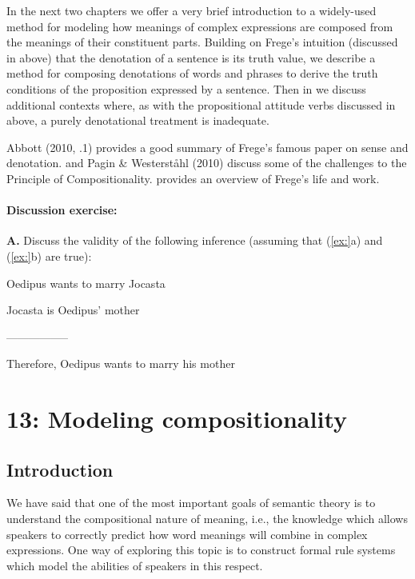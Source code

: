 In the next two chapters we offer a very brief introduction to a widely-used method for modeling how meanings of complex expressions are composed from the meanings of their constituent parts. Building on Frege’s intuition (discussed in  above) that the denotation of a sentence is its truth value, we describe a method for composing denotations of words and phrases to derive the truth conditions of the proposition expressed by a sentence. Then in  we discuss additional contexts where, as with the propositional attitude verbs discussed in  above, a purely denotational treatment is inadequate.



\furtherreading



Abbott (2010, .1) provides a good summary of Frege’s famous paper on sense and denotation. \citet{Goldberg2015} and Pagin \& Westerståhl (2010) discuss some of the challenges to the Principle of Compositionality. \citet{Zalta2017} provides an overview of Frege’s life and work.


\subsubsection{Discussion exercise:}\label{sec:}

\textbf{A.} Discuss the validity of the following inference (assuming that (\ref{ex:}a) and (\ref{ex:}b) are true):

\ea
\ea
Oedipus wants to marry Jocasta

\ex Jocasta is Oedipus’ mother

-----------------

\ex Therefore, Oedipus wants to marry his mother
\z
\z
\chapter{{13}: Modeling compositionality}

\section{Introduction}\label{sec:} %

We have said that one of the most important goals of semantic theory is to understand the compositional nature of meaning, i.e., the knowledge which allows speakers to correctly predict how word meanings will combine in complex expressions. One way of exploring this topic is to construct formal rule systems which model the abilities of speakers in this respect.




